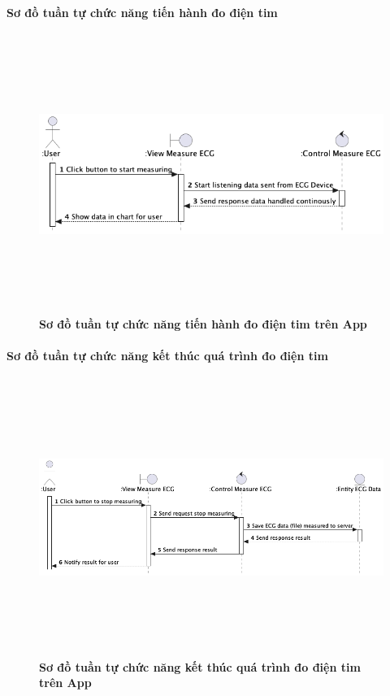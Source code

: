 \paragraph{Sơ đồ tuần tự chức năng tiến hành đo điện tim}
\mbox{}

  \begin{figure}[H]
        \centering
        \includegraphics[width=16cm,height=9cm]{Images/mobile_app/start_measuring_ecg.png}
        \caption[Sơ đồ tuần tự chức năng tiến hành đo điện tim trên App]{\bfseries \fontsize{12pt}{0pt}
        \selectfont Sơ đồ tuần tự chức năng tiến hành đo điện tim trên App}
        \label{hinh21} %
  \end{figure}
 

\paragraph{Sơ đồ tuần tự chức năng kết thúc quá trình đo điện tim}
\mbox{}

  \begin{figure}[H]
        \centering
        \includegraphics[width=16cm,height=9cm]{Images/mobile_app/end_measuring_ecg.png}
        \caption[Sơ đồ tuần tự chức năng kết thúc quá trình đo điện tim trên App]{\bfseries \fontsize{12pt}{0pt}
        \selectfont Sơ đồ tuần tự chức năng kết thúc quá trình đo điện tim trên App}
        \label{hinh21} %
  \end{figure}





\newpage
